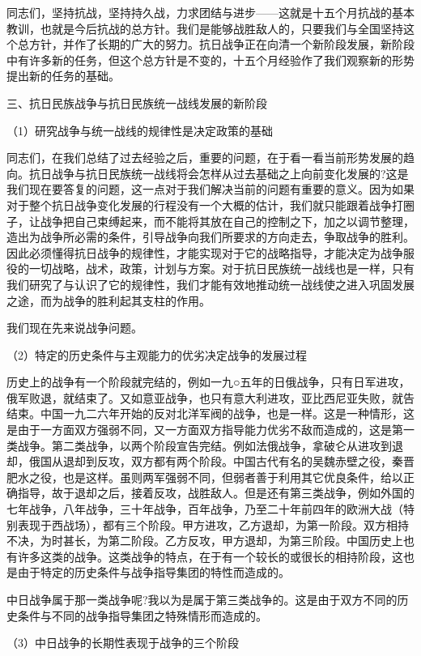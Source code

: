 \documentclass[UTF8, 12pt, a4paper]{ctexrep}
\begin{document}
同志们，坚持抗战，坚持持久战，力求团结与进步——这就是十五个月抗战的基本教训，也就是今后抗战的总方针。我们是能够战胜敌人的，只要我们与全国坚持这个总方针，并作了长期的广大的努力。抗日战争正在向清一个新阶段发展，新阶段中有许多新的任务，但这个总方针是不变的，十五个月经验作了我们观察新的形势提出新的任务的基础。

三、抗日民族战争与抗日民族统一战线发展的新阶段

（1）研究战争与统一战线的规律性是决定政策的基础

同志们，在我们总结了过去经验之后，重要的问题，在于看一看当前形势发展的趋向。抗日战争与抗日民族统一战线将会怎样从过去基础之上向前变化发展的?这是我们现在要答复的问题，这一点对于我们解决当前的问题有重要的意义。因为如果对于整个抗日战争变化发展的行程没有一个大概的估计，我们就只能跟着战争打圈子，让战争把自己束缚起来，而不能将其放在自己的控制之下，加之以调节整理，造出为战争所必需的条件，引导战争向我们所要求的方向走去，争取战争的胜利。因此必须懂得抗日战争的规律性，才能实现对于它的战略指导，才能决定为战争服役的一切战略，战术，政策，计划与方案。对于抗日民族统一战线也是一样，只有我们研究了与认识了它的规律性，我们才能有效地推动统一战线使之进入巩固发展之途，而为战争的胜利起其支柱的作用。

我们现在先来说战争问题。

（2）特定的历史条件与主观能力的优劣决定战争的发展过程

历史上的战争有一个阶段就完结的，例如一九○五年的日俄战争，只有日军进攻，俄军败退，就结束了。又如意亚战争，也只有意大利进攻，亚比西尼亚失败，就告结束。中国一九二六年开始的反对北洋军阀的战争，也是一样。这是一种情形，这是由于一方面双方强弱不同，又一方面双方指导能力优劣不敌而造成的，这是第一类战争。第二类战争，以两个阶段宣告完结。例如法俄战争，拿破仑从进攻到退却，俄国从退却到反攻，双方都有两个阶段。中国古代有名的吴魏赤壁之役，秦晋肥水之役，也是这样。虽则两军强弱不同，但弱者善于利用其它优良条件，给以正确指导，故于退却之后，接着反攻，战胜敌人。但是还有第三类战争，例如外国的七年战争，八年战争，三十年战争，百年战争，乃至二十年前四年的欧洲大战（特别表现于西战场），都有三个阶段。甲方进攻，乙方退却，为第一阶段。双方相持不决，为时甚长，为第二阶段。乙方反攻，甲方退却，为第三阶段。中国历史上也有许多这类的战争。这类战争的特点，在于有一个较长的或很长的相持阶段，这也是由于特定的历史条件与战争指导集团的特性而造成的。

中日战争属于那一类战争呢?我以为是属于第三类战争的。这是由于双方不同的历史条件与不同的战争指导集团之特殊情形而造成的。

（3）中日战争的长期性表现于战争的三个阶段
\end{document}
